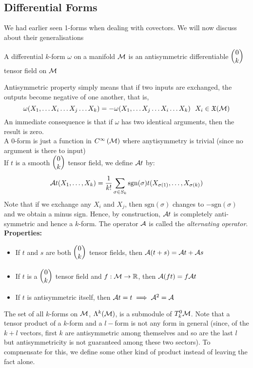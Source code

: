 \subsection{Differential Forms}
We had earlier seen 1-forms when dealing with covectors. We will now discuss about their generalisations
\begin{definition}
    A differential $k$-form  $\omega$ on a manifold $\mathcal M$ is an antisymmetric differentiable $\mqty(0\\k)$ tensor field on $\mathcal M$
\end{definition}
Antisymmetric property simply means that if two inputs are exchanged, the outputs become negative of one another, that is,
$$\omega(X_1,\ldots X_i\ldots X_j \ldots X_k)= -\omega(X_1,\ldots X_j\ldots X_i \ldots X_k) \ \ X_i\in\mathfrak{X}(\SM)$$
An immediate consequence is that if $\omega$ has two identical arguments, then the result is zero. \\[0.2cm]
A $0$-form is just a function in $C^{\infty}\left(\mathcal M\right)$ where anytisymmetry is trivial (since no argument is there to input)\\[0.2cm]
If $t$ is a smooth $\mqty(0\\k)$ tensor field, we define $\mathcal A t$ by:
$$\mathcal A t(X_1,\ldots,X_k) = \frac{1}{k!}\sum\limits_{\sigma \in S_k}\mathrm{sgn}(\sigma)t(X_{\sigma(1)},\ldots,X_{\sigma(k)})$$
Note that if we exchange any $X_i$ and $X_j$, then $\mathrm{sgn}(\sigma)$ changes to $-\mathrm{sgn}(\sigma)$ and we obtain a minus sign. Hence, by construction, $\mathcal A t$ is completely anti-symmetric and hence a $k$-form. The operator $\mathcal A$ is called the \textit{alternating operator}. \\[0.2cm]
\textbf{Properties:}
\begin{itemize}
    \item If $t$ and $s$ are both $\mqty(0\\k)$ tensor fields, then $\mathcal A ( t+s) = \mathcal A t + \mathcal A s$
    \item If $t$ is a $\mqty(0\\k)$ tensor field and $f:\mathcal M\rightarrow \mathbb{R}$, then $\mathcal A (ft) = f\mathcal A t$
    \item If $t$ is antisymmetric itself, then $\mathcal A t= t \implies \mathcal A^2 = \mathcal A$
\end{itemize}
The set of all $k$-forms on $\mathcal M$, $\Lambda^k(\mathcal M)$, is a submodule of $T_k^0\mathcal M$. Note that a tensor product of a $k$-form and a $l-$form is not any form in general (since, of the $k+l$ vectors, first $k$ are antisymmetric among themselves and so are the last $l$ but antisymmetricity is not guaranteed among these two sectors). To compnensate for this, we define some other kind of product instead of leaving the fact alone. 
